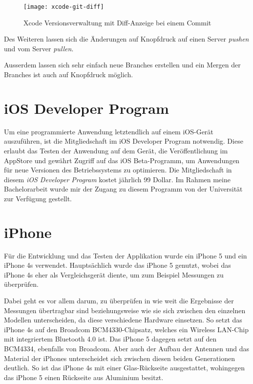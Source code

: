 \begin{figure}[htb!]
		  \centering
	\texttt{[image: xcode-git-diff]}
	\caption{Xcode Versionsverwaltung mit Diff-Anzeige bei einem Commit}
	\label{xcode-git-diff}
\end{figure}

Des Weiteren lassen sich die Änderungen auf Knopfdruck auf einen Server \emph{pushen} und vom Server \emph{pullen}.

Ausserdem lassen sich sehr einfach neue Branches erstellen und ein Mergen der Branches ist auch auf Knopfdruck möglich.


\section{iOS Developer Program}
\label{sec:iosdevprogram}
Um eine programmierte Anwendung letztendlich auf einem iOS-Gerät auszuführen, ist die Mitgliedschaft im iOS Developer Program notwendig.
Diese erlaubt das Testen der Anwendung auf dem Gerät, die Veröffentlichung im AppStore und gewährt Zugriff auf das iOS Beta-Programm, um Anwendungen für neue Versionen des Betriebssystems zu optimieren.
Die Mitgliedschaft in diesem \emph{iOS Developer Program} kostet jährlich 99 Dollar. 
Im Rahmen meine Bachelorarbeit wurde mir der Zugang zu diesem Programm von der Universität zur Verfügung gestellt.



\section{iPhone}
\label{sec:tools:iphone}
Für die Entwicklung und das Testen der Applikation wurde ein iPhone 5 und ein iPhone 4s verwendet. 
Hauptsächlich wurde das iPhone 5 genutzt, wobei das iPhone 4s eher als Vergleichsgerät diente, um zum Beispiel Messungen zu überprüfen.

Dabei geht es vor allem darum, zu überprüfen in wie weit die Ergebnisse der Messungen übertragbar sind beziehungsweise wie sie sich zwischen den einzelnen Modellen unterscheiden, da diese verschiedene Hardware einsetzen. So setzt das iPhone 4s auf den Broadcom BCM4330-Chipsatz, welches ein Wireless LAN-Chip mit integriertem Bluetooth 4.0 ist. Das iPhone 5 dagegen setzt auf den BCM4334, ebenfalls von Broadcom. 
Aber auch der Aufbau der Antennen und das Material der iPhones unterscheidet sich zwischen diesen beiden Generationen deutlich. 
So ist das iPhone 4s mit einer Glas-Rückseite ausgestattet, wohingegen das iPhone 5 einen Rückseite aus Aluminium besitzt.

